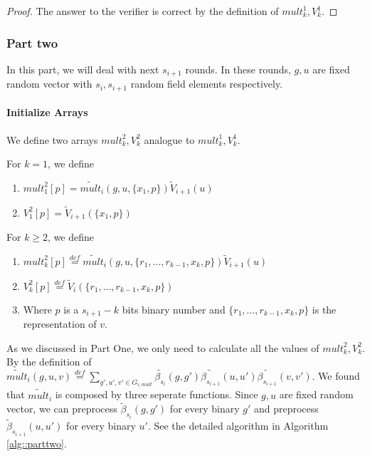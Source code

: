 {\begin{proof}
The answer to the verifier is correct by the definition of ${mult}_k^1, {V}_k^1$.
\end{proof}

\subsubsection{Part two}
In this part, we will deal with next $s_{i+1}$ rounds. In these rounds, $g, u$ are fixed random vector with $s_{i}, s_{i+1}$ random field elements respectively.

\paragraph*{Initialize Arrays}
We define two arrays ${mult}_k^2, {V}_k^2$ analogue to ${mult}_k^1, {V}_k^1$.

\begin{definition}
	For $k=1$, we define 
	\begin{enumerate}
		\item ${mult}_1^2[p] = \tilde{mult}_i(g, u, \{x_1, p\})\tilde{V}_{i+1}(u)$
		\item ${V}_1^2[p] = \tilde{V}_{i+1}(\{x_1, p\})$
	\end{enumerate}
	For $k\ge 2$, we define
	\begin{enumerate}
		\item ${mult}_k^2[p]\overset{def}{=}\tilde{mult}_i(g, u, \{r_1, ..., r_{k-1}, x_k, p\})\tilde{V}_{i+1}(u)$
		\item ${V}_k^2[p]\overset{def}{=}\tilde{V}_i(\{r_1, ..., r_{k-1}, x_k, p\})$
		\item Where $p$ is a $s_{i+1}-k$ bits binary number and $\{r_1, ..., r_{k-1}, x_k, p\}$ is the representation of $v$.
	\end{enumerate}
\end{definition}

As we discussed in Part One, we only need to calculate all the values of ${mult}_k^2, {V}_k^2$. By the definition of $\tilde{mult}_i(g, u, v)\overset{def}{=}\sum_{g', u', v' \in G_{i, mult}}\tilde{\beta_{s_i}}(g, g')\tilde{\beta_{s_{i+1}}}(u, u')\tilde{\beta_{s_{i+1}}}(v, v')$. We found that $\tilde{mult}_i$ is composed by three seperate functions. Since $g, u$ are fixed random vector, we can preprocess $\tilde{\beta}_{s_i}(g, g')$ for every binary $g'$ and preprocess $\tilde{\beta}_{s_{i+1}}(u, u')$ for every binary $u'$. See the detailed algorithm in Algorithm \ref{alg::parttwo}.

}

